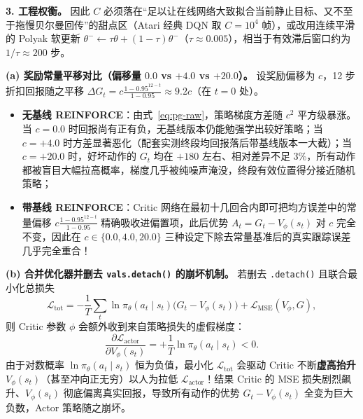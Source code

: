 \textbf{3. 工程权衡。} 因此 $C$ 必须落在“足以让在线网络大致拟合当前静止目标、又不至于拖慢贝尔曼回传”的甜点区（Atari 经典 DQN 取 $C = 10^4$ 帧），或改用连续平滑的 Polyak 软更新 $\theta^- \leftarrow \tau \theta + (1 - \tau)\theta^-$（$\tau \approx 0.005$），相当于有效滞后窗口约为 $1/\tau \approx 200$ 步。


\textbf{(a) 奖励常量平移对比（偏移量 $0.0$ vs $+4.0$ vs $+20.0$）。} 设奖励偏移为 $c$，12 步折扣回报随之平移 $\Delta G_t = c \frac{1 - 0.95^{12-t}}{1 - 0.95} \approx 9.2c$（在 $t=0$ 处）。
\begin{itemize}
  \item \textbf{无基线 REINFORCE}：由式~\eqref{eq:pg-raw}，策略梯度方差随 $c^2$ 平方级暴涨。当 $c = 0.0$ 时回报尚有正有负，无基线版本仍能勉强学出较好策略；当 $c = +4.0$ 时方差显著恶化（配套实测终段均回报落后带基线版本一大截）；当 $c = +20.0$ 时，好坏动作的 $G_t$ 均在 $+180$ 左右、相对差异不足 $3\%$，所有动作都被盲目大幅拉高概率，梯度几乎被纯噪声淹没，终段有效位置得分接近随机策略；
  \item \textbf{带基线 REINFORCE}：Critic 网络在最初十几回合内即可把均方误差中的常量偏移 $c \frac{1 - 0.95^{12-t}}{1 - 0.95}$ 精确吸收进偏置项，此后优势 $A_t = G_t - V_\phi(s_t)$ 对 $c$ 完全不变，因此在 $c \in \{0.0, 4.0, 20.0\}$ 三种设定下除去常量基准后的真实跟踪误差几乎完全重合！
\end{itemize}

\textbf{(b) 合并优化器并删去 \texttt{vals.detach()} 的崩坏机制。} 若删去 \texttt{.detach()} 且联合最小化总损失
\[
  \mathcal{L}_{\mathrm{tot}} = -\frac{1}{T}\sum_{t} \ln \pi_\theta(a_t \mid s_t)\big(G_t - V_\phi(s_t)\big) + \mathcal{L}_{\mathrm{MSE}}(V_\phi, G),
\]
则 Critic 参数 $\phi$ 会额外收到来自策略损失的虚假梯度：
\[
  \frac{\partial \mathcal{L}_{\mathrm{actor}}}{\partial V_\phi(s_t)} = +\frac{1}{T}\ln \pi_\theta(a_t \mid s_t) < 0.
\]
由于对数概率 $\ln \pi_\theta(a_t \mid s_t)$ 恒为负值，最小化 $\mathcal{L}_{\mathrm{tot}}$ 会驱动 Critic 不断\textbf{虚高抬升 $V_\phi(s_t)$}（甚至冲向正无穷）以人为拉低 $\mathcal{L}_{\mathrm{actor}}$！结果 Critic 的 MSE 损失剧烈飙升、$V_\phi(s_t)$ 彻底偏离真实回报，导致所有动作的优势 $G_t - V_\phi(s_t)$ 全变为巨大负数，Actor 策略随之崩坏。


